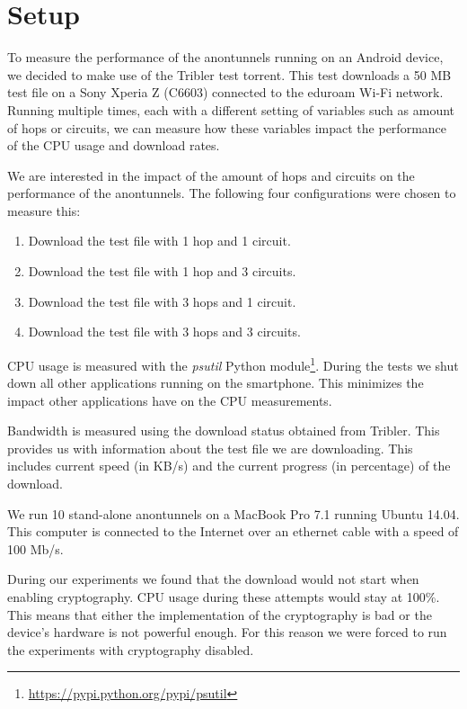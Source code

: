 % 
\section{Setup}
	\label{sec:experiments:approach}
	To measure the performance of the anontunnels running on an Android device, we decided to make use of the Tribler test torrent. This test downloads a 50 MB test file on a Sony Xperia Z (C6603)  connected to the eduroam Wi-Fi network. Running multiple times, each with a different setting of variables such as amount of hops or circuits, we can measure how these variables impact the performance of the CPU usage and download rates.
	
	We are interested in the impact of the amount of hops and circuits on the performance of the anontunnels. The following four configurations were chosen to measure this:
	
	\begin{enumerate}
		\item Download the test file with 1 hop and 1 circuit.
		\item Download the test file with 1 hop and 3 circuits.
		\item Download the test file with 3 hops and 1 circuit.
		\item Download the test file with 3 hops and 3 circuits.
	\end{enumerate}
	
	CPU usage is measured with the \emph{psutil} Python module\footnote{\url{https://pypi.python.org/pypi/psutil}}. During the tests we shut down all other applications running on the smartphone. This minimizes the impact other applications have on the CPU measurements.
	
	Bandwidth is measured using the download status obtained from Tribler. This provides us with information about the test file we are downloading. This includes current speed (in KB/s) and the current progress (in percentage) of the download.
	
	We run 10 stand-alone anontunnels on a MacBook Pro 7.1 running Ubuntu 14.04. This computer is connected to the Internet over an ethernet cable with a speed of 100 Mb/s. 
	
	During our experiments we found that the download would not start when enabling cryptography. CPU usage during these attempts would stay at 100\%. This means that either the implementation of the cryptography is bad or the device's hardware is not powerful enough. For this reason we were forced to run the experiments with cryptography disabled.
	
